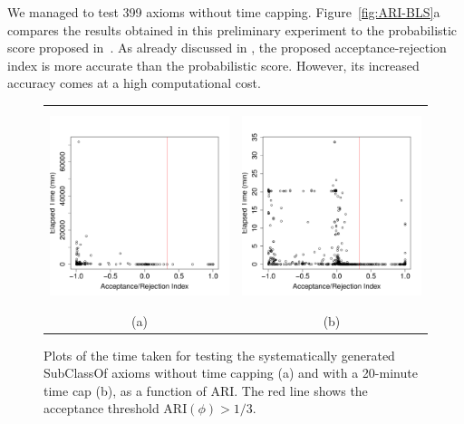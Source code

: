 \documentclass{llncs}
\begin{document}
We managed to test 399 axioms without time capping.
Figure~\ref{fig:ARI-BLS}a compares the results obtained in this preliminary experiment
to the probabilistic score proposed in~\cite{BuehmannLehmann2012}.
As already discussed in \cite{TettamanziFaronZuckerGandon2014ekaw}, the proposed
acceptance-rejection index is more accurate than the probabilistic score.
However, its increased accuracy comes at a high computational cost.

\begin{figure}[t]
\begin{center}
  \begin{tabular}{cc}
    \includegraphics[height=2.25in]{time-ARI} &
    \includegraphics[height=2.25in]{time-ARI-20} \\
    (a) & (b)
  \end{tabular}
\end{center}
\caption{Plots of the time taken for testing the systematically generated
  \textsf{SubClassOf} axioms without time capping (a) and with a 20-minute
  time cap (b), as a function of ARI. The red line shows the acceptance
  threshold $\mathrm{ARI}(\phi)>1/3$.}
\label{fig:time-ARI}
\end{figure}
\end{document}

